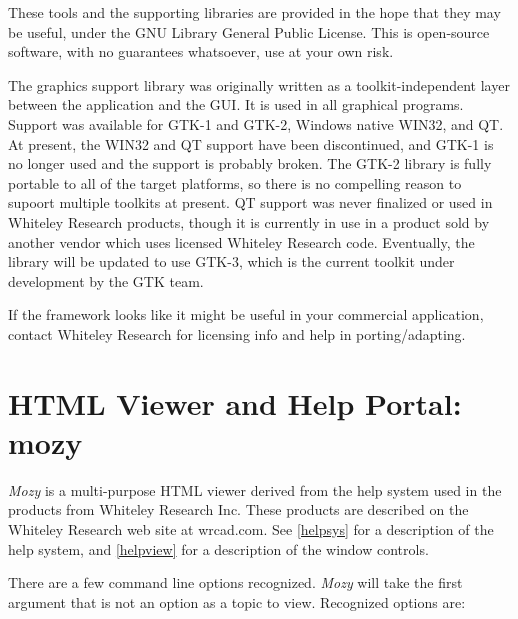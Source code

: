 These tools and the supporting libraries are provided in the hope that
they may be useful, under the GNU Library General Public License. 
This is open-source software, with no guarantees whatsoever, use at
your own risk.

The graphics support library was originally written as a
toolkit-independent layer between the application and the GUI.  It is
used in all graphical {\XicTools} programs.  Support was available for
GTK-1 and GTK-2, Windows native WIN32, and QT.  At present, the WIN32
and QT support have been discontinued, and GTK-1 is no longer used and
the support is probably broken.  The GTK-2 library is fully portable
to all of the target platforms, so there is no compelling reason to
supoort multiple toolkits at present.  QT support was never finalized
or used in Whiteley Research products, though it is currently in use
in a product sold by another vendor which uses licensed Whiteley
Research code.  Eventually, the library will be updated to use GTK-3,
which is the current toolkit under development by the GTK team.

If the framework looks like it might be useful in your commercial
application, contact Whiteley Research for licensing info and help in
porting/adapting.


\section{HTML Viewer and Help Portal:  {\vt mozy}}

{\it Mozy} is a multi-purpose HTML viewer derived from the help system
used in the {\XicTools} products from Whiteley Research Inc.  These
products are described on the Whiteley Research web site at {\vt
wrcad.com}.  See \ref{helpsys} for a description of the {\Xic} help
system, and \ref{helpview} for a description of the window controls.

There are a few command line options recognized.  {\it Mozy} will take
the first argument that is not an option as a topic to view. 
Recognized options are:

